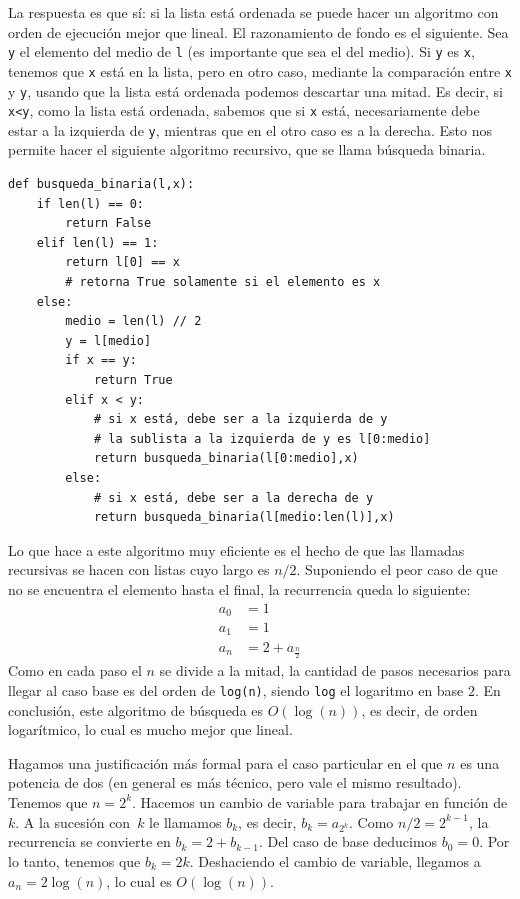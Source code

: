 \documentclass[a4paper, 12pt]{report}
\theoremstyle{definition}
\begin{document}
La respuesta es que sí: si la lista está ordenada se puede hacer un algoritmo con orden de ejecución mejor que lineal. El razonamiento de fondo es el siguiente. Sea {\tt y} el elemento del medio de {\tt l} (es importante que sea el del medio). Si {\tt y} es {\tt x}, tenemos que {\tt x} está en la lista, pero en otro caso, mediante la comparación entre {\tt x} y {\tt y}, usando que la lista está ordenada podemos descartar una mitad. Es decir, si {\tt x<y}, como la lista está ordenada, sabemos que si {\tt x} está, necesariamente debe estar a la izquierda de {\tt y}, mientras que en el otro caso es a la derecha. Esto nos permite hacer el siguiente algoritmo recursivo, que se llama búsqueda binaria.
\begin{verbatim}
def busqueda_binaria(l,x):
    if len(l) == 0:
        return False
    elif len(l) == 1:
        return l[0] == x
        # retorna True solamente si el elemento es x
    else:
        medio = len(l) // 2
        y = l[medio]
        if x == y:
            return True
        elif x < y:
            # si x está, debe ser a la izquierda de y
            # la sublista a la izquierda de y es l[0:medio]
            return busqueda_binaria(l[0:medio],x)
        else:
            # si x está, debe ser a la derecha de y
            return busqueda_binaria(l[medio:len(l)],x)
\end{verbatim}
Lo que hace a este algoritmo muy eficiente es el hecho de que las llamadas recursivas se hacen con listas cuyo largo es $n/2$. Suponiendo el peor caso de que no se encuentra el elemento hasta el final, la recurrencia queda lo siguiente:
\begin{align*}
	a_0 &= 1\\
	a_1 &= 1\\
	a_n &= 2 + a_{\frac{n}{2}}
\end{align*}
Como en cada paso el $n$ se divide a la mitad, la cantidad de pasos necesarios para llegar al caso base es del orden de {\tt log(n)}, siendo {\tt log} el logaritmo en base $2$. En conclusión, este algoritmo de búsqueda es $O(\log(n))$, es decir, de orden logarítmico, lo cual es mucho mejor que lineal.

Hagamos una justificación más formal para el caso particular en el que $n$ es una potencia de dos (en general es más técnico, pero vale el mismo resultado). Tenemos que $n = 2^k$. Hacemos un cambio de variable para trabajar en función de $k$. A la sucesión con~$k$ le llamamos $b_k$, es decir, $b_k = a_{2^k}$. Como $n/2 = 2^{k-1}$, la recurrencia se convierte en $b_k = 2 + b_{k-1}$. Del caso de base deducimos $b_0=0$. Por lo tanto, tenemos que $b_k = 2k$. Deshaciendo el cambio de variable, llegamos a $a_n = 2\log(n)$, lo cual es $O(\log(n))$.
\end{document}
